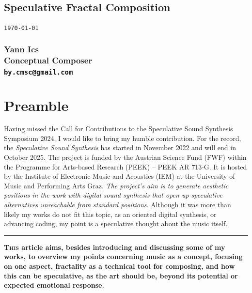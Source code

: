 \documentclass{article}
\begin{document}
\begin{center}
\section*{\huge \sffamily Speculative Fractal Composition}

\texttt{\today}
\subsubsection*{Yann Ics\\Conceptual Composer\\\texttt{\small by.cmsc@gmail.com}}

\end{center}

\vspace{0.7cm}

\section*{Preamble}

Having missed the Call for Contributions to the Speculative Sound Synthesis Symposium 2024, I would like to bring my humble contribution. For the record, the \textit{Speculative Sound Synthesis} has started in November 2022 and will end in October 2025. The project is funded by the Austrian Science Fund (FWF) within the Programme for Arts-based Research (PEEK) – PEEK AR 713-G. It is hosted by the Institute of Electronic Music and Acoustics (IEM) at the University of Music and Performing Arts Graz.
\textit{The project’s aim is to generate aesthetic positions in the work with digital sound synthesis that open up speculative alternatives unreachable from standard positions}.\cite{iem}
Although it was more than likely my works do not fit this topic, as an oriented digital synthesis, or advancing coding, my point is a speculative thought about the music itself.

\smallskip

\noindent \rule{\linewidth}{.5pt}

\bfseries
\lettrine[lhang=.03]{T}{his} article aims, besides introducing and discussing some of my works, to overview my points concerning music as a concept, focusing on one aspect, fractality as a technical tool for composing, and how this can be speculative, as the art should be, beyond its potential or expected emotional response.

\mdseries

\bigskip
\end{document}
